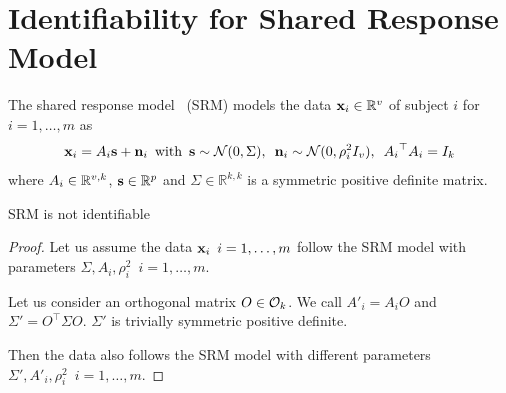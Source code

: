 \documentclass[12pt]{report}
\begin{document}
\section{Identifiability for Shared Response Model}
\label{sec:app_identifiability}
The shared response model~\cite{chen2015reduced} (SRM) models the data $\mathbf{x}_i \in \mathbb{R}^v$ of subject $i$ for $i = 1,\dots, m$ as
\begin{align*}
    \mathbf{x}_i = A_i \mathbf{s} + \mathbf{n}_i \enspace \text{with} \enspace \mathbf{s} \sim \mathcal{N}(0, \Sigma), \enspace\mathbf{n}_i \sim \mathcal{N}(0, \rho_i^2 I_v), \enspace {A_i}^{\top}A_i = I_k
\end{align*}
where $A_i \in \mathbb{R}^{v, k}$, $\mathbf{s} \in \mathbb{R}^p$ and  $\Sigma \in \mathbb{R}^{k, k}$ is a symmetric positive definite matrix.

\begin{proposition}
SRM is not identifiable
\end{proposition}
\begin{proof}
Let us assume the data $\mathbf{x}_i \enspace i=1, \dots, m$ follow the SRM model with parameters $\Sigma, A_i, \rho_i^2 \enspace i=1, \dots, m$. 

Let us consider an orthogonal matrix $O \in \mathcal{O}_k$.
We call $A'_i = A_i O$ and $\Sigma' = O^{\top} \Sigma O$. 
$\Sigma'$ is trivially symmetric positive definite.

Then the data also follows the SRM model with different parameters $\Sigma', A'_i, \rho_i^2 \enspace i=1, \dots, m$.
\end{proof}
\end{document}
